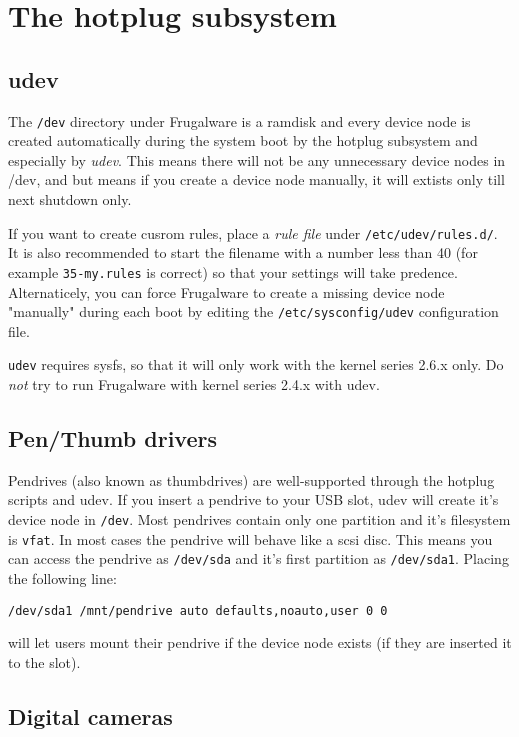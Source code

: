 \chapter{The hotplug subsystem}
\section{udev}

The {\tt /dev} directory under Frugalware is a ramdisk and every device node is created automatically during the system boot by the hotplug subsystem and especially by \textit{udev}. This means there will not be any unnecessary device nodes in /dev, and but means if you create a device node manually, it will extists only till next shutdown only.

If you want to create cusrom rules, place a \textit{rule file} under
{\tt /etc/udev/rules.d/}. It is also recommended to start the filename with a
number less than 40 (for example {\tt 35-my.rules} is correct) so that your
settings will take predence. Alternaticely, you can force Frugalware to create
a missing device node "manually" during each boot by editing the
{\tt /etc/sysconfig/udev} configuration file.

{\tt udev} requires sysfs, so that it will only work with the kernel series
2.6.x only. Do \textit{not} try to run Frugalware with kernel series 2.4.x with
udev.

\section{Pen/Thumb drivers}

Pendrives (also known as thumbdrives) are well-supported through the hotplug scripts and udev. If you insert a pendrive to your USB slot, udev will create it's device node in {\tt /dev}. Most pendrives contain only one partition and it's filesystem is {\tt vfat}. In most cases the pendrive will behave like a scsi disc. This means you can access the pendrive as {\tt /dev/sda} and it's first partition as {\tt /dev/sda1}. Placing the following line:

{\tt /dev/sda1        /mnt/pendrive    auto        defaults,noauto,user 0 0}

will let users mount their pendrive if the device node exists (if they are inserted it to the slot).

\section{Digital cameras}

